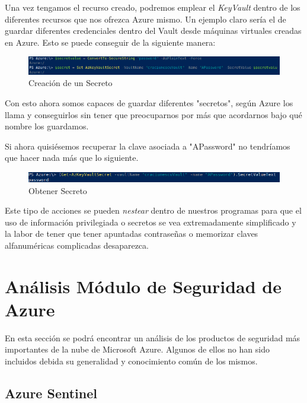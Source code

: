 \documentclass[english,runningheads,a4paper]{llncs}[2018/03/10]
\begin{document}
Una vez tengamos el recurso creado, podremos emplear el \textit{KeyVault} dentro
de los diferentes recursos que nos ofrezca Azure mismo. Un ejemplo claro sería
el de guardar diferentes credenciales dentro del Vault desde máquinas virtuales
creadas en Azure. Esto se puede conseguir de la siguiente manera:

\begin{figure}[h!]
    \includegraphics[width=\linewidth]{./Seguridad/Azure/Selection_012.png}
    \caption{Creación de un Secreto}
\end{figure}

Con esto ahora somos capaces de guardar diferentes "secretos", según Azure los
llama y conseguirlos sin tener que preocuparnos por más que acordarnos bajo qué
nombre los guardamos.

Si ahora quisiésemos recuperar la clave asociada a "APassword" no tendríamos que
hacer nada más que lo siguiente.

\begin{figure}[h!]
    \includegraphics[width=\linewidth]{./Seguridad/Azure/Selection_013.png}
    \caption{Obtener Secreto}
\end{figure}

Este tipo de acciones se pueden \textit{nestear} dentro de nuestros programas
para que el uso de información privilegiada o secretos se vea extremadamente
simplificado y la labor de tener que tener apuntadas contraseñas o memorizar
claves alfanuméricas complicadas desaparezca.

\section*{Análisis Módulo de Seguridad de Azure}

En esta sección se podrá encontrar un análisis de los productos de seguridad más
importantes de la nube de Microsoft Azure. Algunos de ellos no han
sido incluidos debida su generalidad y conocimiento común de los mismos. 

\subsection*{Azure Sentinel}
\end{document}
